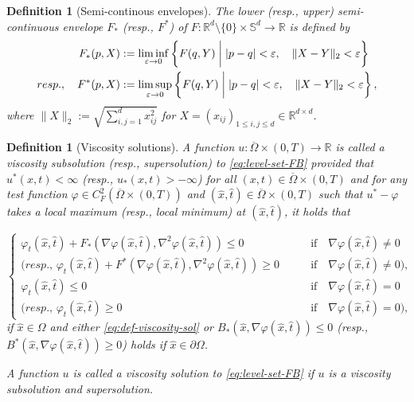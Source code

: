 \documentclass[11pt]{article}
\numberwithin{equation}{section}
\newtheorem{defn}[theorem]{Definition}
\newcommand{\R}{\mathbb{R}}
\def\le{\leqslant}
\def\leq{\leqslant}
\def\ge{\geqslant}
\begin{document}

\begin{defn}[Semi-continous envelopes]
    The lower (resp., upper) semi-continuous envelope $F_*$ (resp., $F^*$) of $F:\R^d\setminus\{0\}\times\mathbb S^d\to\R$ is defined by
    \begin{align*}
        F_*(p,X) &:= \liminf_{\varepsilon\to 0}\left\{F(q,Y)\biggm| |p - q| < \varepsilon,\quad \|X-Y\|_2 < \varepsilon\right\}\\
        resp.,\quad F^*(p,X) &:= \limsup_{\varepsilon\to 0}\left\{F(q,Y)\biggm| |p - q| < \varepsilon,\quad \|X-Y\|_2 < \varepsilon\right\},
    \end{align*}
    where $\|X\|_2 := \sqrt{\sum_{i,j=1}^d x_{ij}^2}$ for $X = (x_{ij})_{1\leq i,j\leq d}\in \R^{d\times d}$.
\end{defn}

\begin{defn}[Viscosity solutions]
\label{dfn:viscosity-sol}
A function $u:\overline{\Omega}\times(0,T)\to \R$ is called a viscosity subsolution (resp., supersolution) to \eqref{eq:level-set-FB} provided that $u^*(x,t) < \infty$ (resp., $u_*(x,t) > -\infty$) for all $(x,t)\in\overline{\Omega}\times(0,T)$ and for any test function $\varphi\in C^2_F(\overline{\Omega}\times(0,T))$ and $(\hat x, \hat t)\in \overline{\Omega}\times(0,T)$ such that $u^*-\varphi$ takes a local maximum (resp., local minimum) at $(\hat x,\hat t)$, it holds that

\begin{equation}
\label{eq:def-viscosity-sol}
    \begin{cases}
        \varphi_t(\hat x,\hat t) + F_*(\nabla\varphi(\hat x,\hat t), \nabla^2\varphi(\hat x,\hat t)) \le 0 &\qquad\mbox{if}\quad \nabla\varphi(\hat x,\hat t) \neq 0\\
        (resp.,\, \varphi_t(\hat x,\hat t) + F^*(\nabla\varphi(\hat x,\hat t), \nabla^2\varphi(\hat x,\hat t)) \ge 0 &\qquad\mbox{if}\quad \nabla\varphi(\hat x,\hat t) \neq 0),\\
        \varphi_t(\hat x,\hat t)\le 0&\qquad \mbox{if}\quad \nabla\varphi(\hat x,\hat t) = 0\\
        (resp.,\, \varphi_t(\hat x, \hat t)\ge 0 &\qquad\mbox{if}\quad \nabla \varphi(\hat x, \hat t) = 0),
    \end{cases}
\end{equation}
if $\hat x\in \Omega$ and either \eqref{eq:def-viscosity-sol} or $B_*(\hat x, \nabla\varphi(\hat x,\hat t))\le 0$ (resp., $B^*(\hat x,\nabla\varphi(\hat x, \hat t)) \ge 0$) holds if $\hat x\in\partial\Omega$.

A function $u$ is called a viscosity solution to \eqref{eq:level-set-FB} if $u$ is a viscosity subsolution and supersolution.
\end{defn}
\end{document}
